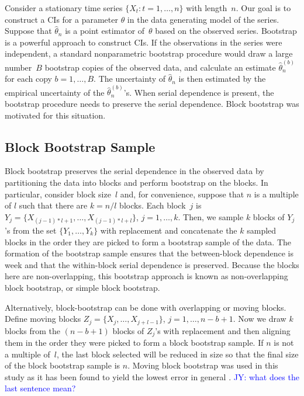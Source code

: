 \documentclass[12pt, letterpaper, titlepage]{article}
\newcommand{\jy}[1]{\textcolor{blue}{JY: #1}}
\begin{document}
Consider a stationary time series $\{X_t: t = 1, \ldots, n\}$ with length~$n$.
Our goal is to construct a CIs for a parameter $\theta$ in the
data generating model of the series. Suppose that $\hat\theta_n$ is a point
estimator of~$\theta$ based on the observed series. Bootstrap is a powerful
approach to construct CIs. If the observations in the series
were independent, a standard nonparametric bootstrap procedure would draw a
large number~$B$ bootstrap copies of the observed data, and calculate an
estimate $\hat\theta_n^{(b)}$ for each copy $b = 1, \ldots, B$. The uncertainty
of $\hat\theta_n$ is then estimated by the empirical uncertainty of the
$\hat\theta_n^{(b)}$'s. When serial dependence is present, the bootstrap
procedure needs to preserve the serial dependence. Block bootstrap was
motivated for this situation. 


\subsection{Block Bootstrap Sample}

Block bootstrap preserves the serial dependence in the observed data by
partitioning the data into blocks and perform bootstrap on the blocks.
In particular, consider block size~$l$ and, for convenience, suppose that
$n$ is a multiple of $l$ such that there are $k = n / l$ blocks. Each block~$j$
is $Y_j = \{X_{(j - 1) * l + 1}, \ldots, X_{(j - 1) * l + l}\}$,
$j = 1, \ldots,   k$.  Then, we sample $k$ blocks of $Y_j$'s from the set 
$\{Y_1, \ldots, Y_k\}$ with replacement and concatenate the $k$ sampled blocks
in the order they are picked to form a bootstrap sample of the data. The
formation of the bootstrap sample ensures that the between-block dependence is
week and that the within-block serial dependence is preserved. Because the
blocks here are non-overlapping, this bootstrap approach is known as
non-overlapping block bootstrap, or simple block bootstrap.


Alternatively, block-bootstrap can be done with overlapping or moving blocks.
Define moving blocks $Z_j = \{X_j, \ldots, X_{j + l - 1}\}$,
$j = 1, \ldots, n - b + 1$. Now we draw $k$ blocks from the $(n - b + 1)$
blocks
of $Z_j$'s with replacement and then aligning them in the order they were
picked
to form a block bootstrap sample. If $n$ is not a multiple of~$l$, the last
block selected will be reduced in size so that the final size of the
block bootstrap sample is $n$. Moving block bootstrap was used in
this study as it has been found to yield the lowest error in general
\citep{radovanov2014comparison}.  
\jy{what does the last sentence mean?}
\end{document}
